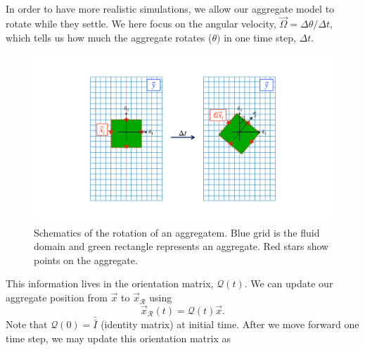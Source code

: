 \\
In order to have more realistic simulations, we allow our aggregate model to rotate while they settle.
We here focus on the angular velocity, $\vec{\Omega} = \Delta \theta / \Delta t$, which tells us how much the aggregate rotates ($\theta)$ in one time step, $\Delta t$. 
\begin{figure}[ht]
	\begin{center}
		\includegraphics[scale=0.25]{./figures/fig_rotation_schematics.pdf}
	\caption{Schematics of the rotation of an aggregatem. Blue grid is the fluid domain and green rectangle represents an aggregate. Red stars show points on the aggregate.}
	\label{fig_rotation_schematics}
\end{center}
\end{figure}
This information lives in the orientation matrix, $\mathcal{Q}(t)$. We can update our aggregate position from $\vec{x}$ to $\vec{x}_{\mathcal{R}}$ using
\[
\vec{x}_{\mathcal{R}}(t) = \mathcal{Q}(t) \vec{x}.
\]
Note that $\mathcal{Q}(0) = \bar{\bar{I}}$ (identity matrix) at initial time. After we move forward one time step, we may update this orientation matrix as 

